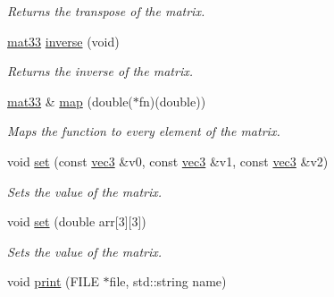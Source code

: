 \begin{DoxyCompactItemize}
\begin{DoxyCompactList}\small\item\em \-Returns the transpose of the matrix. \end{DoxyCompactList}\item 
\hypertarget{classutil_1_1math_1_1mat33_a8e8805ded1df790e903db5dbb2fad1e8}{\hyperlink{classutil_1_1math_1_1mat33}{mat33} \hyperlink{classutil_1_1math_1_1mat33_a8e8805ded1df790e903db5dbb2fad1e8}{inverse} (void)}\label{classutil_1_1math_1_1mat33_a8e8805ded1df790e903db5dbb2fad1e8}

\begin{DoxyCompactList}\small\item\em \-Returns the inverse of the matrix. \end{DoxyCompactList}\item 
\hypertarget{classutil_1_1math_1_1mat33_a8da8164e4b80b47c8e039d7b9d2bbc50}{\hyperlink{classutil_1_1math_1_1mat33}{mat33} \& \hyperlink{classutil_1_1math_1_1mat33_a8da8164e4b80b47c8e039d7b9d2bbc50}{map} (double($\ast$fn)(double))}\label{classutil_1_1math_1_1mat33_a8da8164e4b80b47c8e039d7b9d2bbc50}

\begin{DoxyCompactList}\small\item\em \-Maps the function to every element of the matrix. \end{DoxyCompactList}\item 
\hypertarget{classutil_1_1math_1_1mat33_a609b696742eb3871ccd570b788688e0a}{void \hyperlink{classutil_1_1math_1_1mat33_a609b696742eb3871ccd570b788688e0a}{set} (const \hyperlink{classutil_1_1math_1_1vec3}{vec3} \&v0, const \hyperlink{classutil_1_1math_1_1vec3}{vec3} \&v1, const \hyperlink{classutil_1_1math_1_1vec3}{vec3} \&v2)}\label{classutil_1_1math_1_1mat33_a609b696742eb3871ccd570b788688e0a}

\begin{DoxyCompactList}\small\item\em \-Sets the value of the matrix. \end{DoxyCompactList}\item 
\hypertarget{classutil_1_1math_1_1mat33_af87b9f7e3cf37af7305b0272ad027533}{void \hyperlink{classutil_1_1math_1_1mat33_af87b9f7e3cf37af7305b0272ad027533}{set} (double arr\mbox{[}3\mbox{]}\mbox{[}3\mbox{]})}\label{classutil_1_1math_1_1mat33_af87b9f7e3cf37af7305b0272ad027533}

\begin{DoxyCompactList}\small\item\em \-Sets the value of the matrix. \end{DoxyCompactList}\item 
\hypertarget{classutil_1_1math_1_1mat33_aa9e09b285f5c7adcb98aec887d6edbdf}{void \hyperlink{classutil_1_1math_1_1mat33_aa9e09b285f5c7adcb98aec887d6edbdf}{print} (\-F\-I\-L\-E $\ast$file, std\-::string name)}\label{classutil_1_1math_1_1mat33_aa9e09b285f5c7adcb98aec887d6edbdf}


\end{DoxyCompactItemize}
